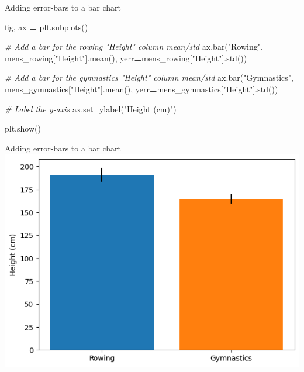 \documentclass[
  ignorenonframetext,
]{beamer}
\newenvironment{Shaded}{\begin{snugshade}}{\end{snugshade}}
\newcommand{\CommentTok}[1]{\textcolor[rgb]{0.56,0.35,0.01}{\textit{#1}}}
\newcommand{\NormalTok}[1]{#1}
\newcommand{\OperatorTok}[1]{\textcolor[rgb]{0.81,0.36,0.00}{\textbf{#1}}}
\newcommand{\StringTok}[1]{\textcolor[rgb]{0.31,0.60,0.02}{#1}}
\begin{document}
\begin{frame}[fragile]{Adding error-bars to a bar chart}
\label{adding-error-bars-to-a-bar-chart-2}

\begin{Shaded}
\begin{Highlighting}[]
\NormalTok{fig, ax }\OperatorTok{=}\NormalTok{ plt.subplots()}

\CommentTok{\# Add a bar for the rowing "Height" column mean/std}
\NormalTok{ax.bar(}\StringTok{"Rowing"}\NormalTok{, mens\_rowing[}\StringTok{"Height"}\NormalTok{].mean(), yerr}\OperatorTok{=}\NormalTok{mens\_rowing[}\StringTok{"Height"}\NormalTok{].std())}

\CommentTok{\# Add a bar for the gymnastics "Height" column mean/std}
\NormalTok{ax.bar(}\StringTok{"Gymnastics"}\NormalTok{, mens\_gymnastics[}\StringTok{"Height"}\NormalTok{].mean(), yerr}\OperatorTok{=}\NormalTok{mens\_gymnastics[}\StringTok{"Height"}\NormalTok{].std())}

\CommentTok{\# Label the y{-}axis}
\NormalTok{ax.set\_ylabel(}\StringTok{"Height (cm)"}\NormalTok{)}

\NormalTok{plt.show()}
\end{Highlighting}
\end{Shaded}
\end{frame}

\begin{frame}{Adding error-bars to a bar chart}
\label{adding-error-bars-to-a-bar-chart-3}
\includegraphics{../images/im244.png}
\end{frame}
\end{document}
